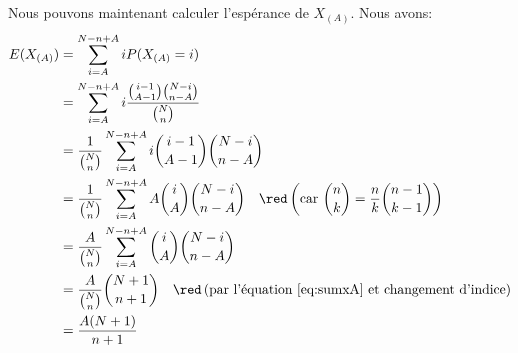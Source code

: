 \documentclass[10pt]{article}
\begin{document}
Nous pouvons maintenant calculer l'espérance de \(X_{(A)}\). Nous avons:
\begin{align}
E(X_{(A)}) &= \sum_{i=A}^{N-n+A} iP(X_{(A)}=i) \nonumber\\
&= \sum_{i=A}^{N-n+A} i\dfrac{\binom{i-1}{A-1}\binom{N-i}{n-A}}{\binom{N}{n}} \nonumber\\
&= \dfrac{1}{\binom{N}{n}}\sum_{i=A}^{N-n+A} i\binom{i-1}{A-1}\binom{N-i}{n-A} \nonumber\\
&= \dfrac{1}{\binom{N}{n}}\sum_{i=A}^{N-n+A} A\binom{i}{A}\binom{N-i}{n-A} 
\comeq{car $\binom{n}{k}=\dfrac{n}{k}\binom{n-1}{k-1}$} \nonumber\\
&= \dfrac{A}{\binom{N}{n}}\sum_{i=A}^{N-n+A} \binom{i}{A}\binom{N-i}{n-A} \nonumber\\
&= \dfrac{A}{\binom{N}{n}}\binom{N+1}{n+1} \comeq{par l'équation \ref{eq:sumxA} et changement d'indice} \nonumber\\
&= \dfrac{A(N+1)}{n+1} \label{eq:esperancexA}
\end{align}


\end{document}
